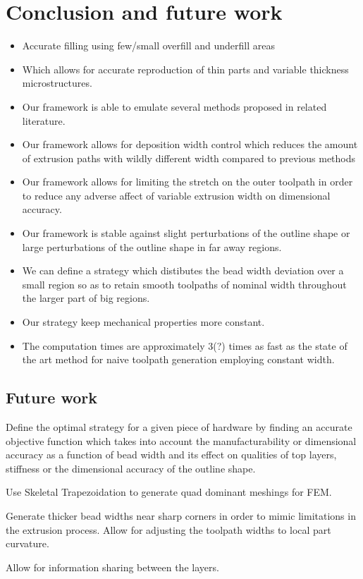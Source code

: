 \section{Conclusion and future work}

\begin{itemize}
\item Accurate filling using few/small overfill and underfill areas
\item Which allows for accurate reproduction of thin parts and variable thickness microstructures.
\item Our framework is able to emulate several methods proposed in related literature.
\item Our framework allows for deposition width control which reduces the amount of extrusion paths with wildly different width compared to previous methods
\item Our framework allows for limiting the stretch on the outer toolpath in order to reduce any adverse affect of variable extrusion width on dimensional accuracy.
\item Our framework is stable against slight perturbations of the outline shape or large perturbations of the outline shape in far away regions.
\item We can define a strategy which distibutes the bead width deviation over a small region so as to retain smooth toolpaths of nominal width throughout the larger part of big regions.
\item Our strategy keep mechanical properties more constant.
\item The computation times are approximately 3(?) times as fast as the state of the art method for naive toolpath generation employing constant width.
\end{itemize}



\subsection{Future work}
Define the optimal strategy for a given piece of hardware by finding an accurate objective function which takes into account the manufacturability or dimensional accuracy as a function of bead width and its effect on qualities of top layers, stiffness or the dimensional accuracy of the outline shape.

Use Skeletal Trapezoidation to generate quad dominant meshings for FEM.

Generate thicker bead widths near sharp corners in order to mimic limitations in the extrusion process.
Allow for adjusting the toolpath widths to local part curvature.

Allow for information sharing between the layers.